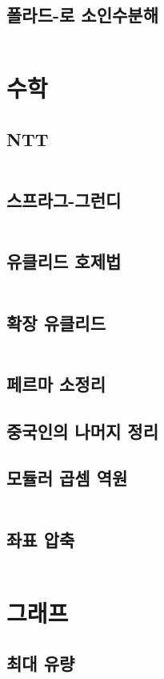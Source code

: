 \documentclass{article}
\begin{document}
\begin{multicols}{2}
\subsection{폴라드-로 소인수분해}
\inputminted[linenos, breaklines]{python}{codes/pollard-rho.py}

\section{수학}
\subsection{NTT}
\inputminted[linenos, breaklines]{python}{codes/ntt.py}
\subsection{스프라그-그런디}
\inputminted[linenos, breaklines]{python}{codes/nim.py}
\subsection{유클리드 호제법}
\inputminted[linenos, breaklines]{cpp}{codes/euclid.cpp}
\subsection{확장 유클리드}
\inputminted[linenos, breaklines]{python}{codes/eea.py}
\subsection{페르마 소정리}

\subsection{중국인의 나머지 정리}
\subsection{모듈러 곱셈 역원}
\inputminted[linenos, breaklines]{python}{codes/modular.py}
\subsection{좌표 압축}
\inputminted[linenos, breaklines]{python}{codes/comp.py}

\section{그래프}
\subsection{최대 유량}
\inputminted[linenos, breaklines]{python}{codes/mf.py}

\end{multicols}
\end{document}
